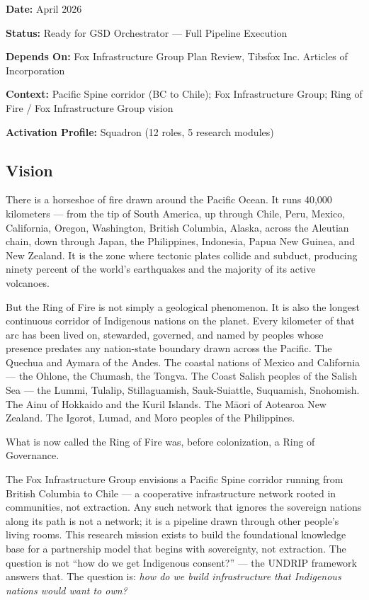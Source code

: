 \documentclass[11pt,letterpaper]{article}
\newcommand{\metafield}[2]{\textbf{\sffamily #1} #2\par}
\begin{document}
\metafield{Date:}{April 2026}
\metafield{Status:}{Ready for GSD Orchestrator — Full Pipeline Execution}
\metafield{Depends On:}{Fox Infrastructure Group Plan Review, Tibsfox Inc. Articles of Incorporation}
\metafield{Context:}{Pacific Spine corridor (BC to Chile); Fox Infrastructure Group; Ring of Fire / Fox Infrastructure Group vision}
\metafield{Activation Profile:}{Squadron (12 roles, 5 research modules)}

\subsection{Vision}

There is a horseshoe of fire drawn around the Pacific Ocean. It runs 40,000 kilometers --- from the tip of South America, up through Chile, Peru, Mexico, California, Oregon, Washington, British Columbia, Alaska, across the Aleutian chain, down through Japan, the Philippines, Indonesia, Papua New Guinea, and New Zealand. It is the zone where tectonic plates collide and subduct, producing ninety percent of the world's earthquakes and the majority of its active volcanoes.

But the Ring of Fire is not simply a geological phenomenon. It is also the longest continuous corridor of Indigenous nations on the planet. Every kilometer of that arc has been lived on, stewarded, governed, and named by peoples whose presence predates any nation-state boundary drawn across the Pacific. The Quechua and Aymara of the Andes. The coastal nations of Mexico and California --- the Ohlone, the Chumash, the Tongva. The Coast Salish peoples of the Salish Sea --- the Lummi, Tulalip, Stillaguamish, Sauk-Suiattle, Suquamish, Snohomish. The Ainu of Hokkaido and the Kuril Islands. The Māori of Aotearoa New Zealand. The Igorot, Lumad, and Moro peoples of the Philippines.

What is now called the Ring of Fire was, before colonization, a Ring of Governance.

The Fox Infrastructure Group envisions a Pacific Spine corridor running from British Columbia to Chile --- a cooperative infrastructure network rooted in communities, not extraction. Any such network that ignores the sovereign nations along its path is not a network; it is a pipeline drawn through other people's living rooms. This research mission exists to build the foundational knowledge base for a partnership model that begins with sovereignty, not extraction. The question is not ``how do we get Indigenous consent?'' --- the UNDRIP framework answers that. The question is: \textit{how do we build infrastructure that Indigenous nations would want to own?}
\end{document}
